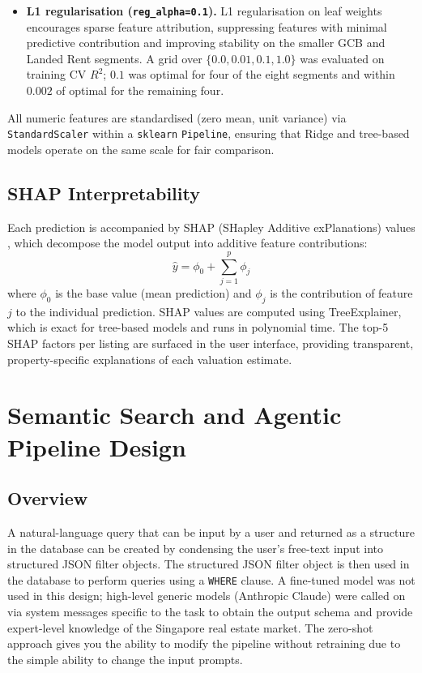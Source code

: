 \begin{itemize}
    \item \textbf{L1 regularisation (\texttt{reg\_alpha=0.1}).}
    L1 regularisation on leaf weights encourages sparse feature attribution, suppressing
    features with minimal predictive contribution and improving stability on the smaller GCB
    and Landed Rent segments. A grid over $\{0.0, 0.01, 0.1, 1.0\}$ was evaluated on
    training CV $R^2$; $0.1$ was optimal for four of the eight segments and within $0.002$
    of optimal for the remaining four.

\end{itemize}

All numeric features are standardised (zero mean, unit variance) via \texttt{StandardScaler}
within a \texttt{sklearn} \texttt{Pipeline}, ensuring that Ridge and tree-based models
operate on the same scale for fair comparison.

\subsection{SHAP Interpretability}

Each prediction is accompanied by SHAP (SHapley Additive exPlanations) values \cite{lundberg2017unified}, which decompose the model output into additive feature contributions:
\[
\hat{y} = \phi_0 + \sum_{j=1}^{p} \phi_j
\]
where $\phi_0$ is the base value (mean prediction) and $\phi_j$ is the contribution of feature $j$ to the individual prediction. SHAP values are computed using TreeExplainer, which is exact for tree-based models and runs in polynomial time. The top-5 SHAP factors per listing are surfaced in the user interface, providing transparent, property-specific explanations of each valuation estimate.

\section{Semantic Search and Agentic Pipeline Design}
\label{sec:methodology_nlsearch}

\subsection{Overview}

A natural-language query that can be input by a user and returned as a structure in the database can be created by condensing the user's free-text input into structured JSON filter objects. The structured JSON filter object is then used in the database to perform queries using a \texttt{WHERE} clause. A fine-tuned model was not used in this design; high-level generic models (Anthropic Claude) were called on via system messages specific to the task to obtain the output schema and provide expert-level knowledge of the Singapore real estate market. The zero-shot approach gives you the ability to modify the pipeline without retraining due to the simple ability to change the input prompts.


